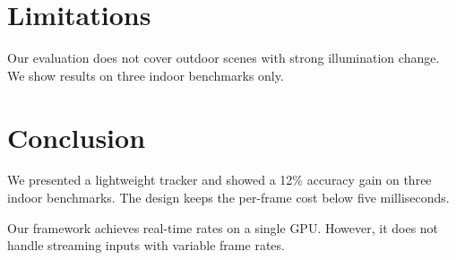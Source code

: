 \documentclass{article}
\begin{document}
\section*{Limitations}
Our evaluation does not cover outdoor scenes with strong illumination change.
We show results on three indoor benchmarks only.

\section{Conclusion}
We presented a lightweight tracker and showed a 12\% accuracy gain on three indoor benchmarks.
The design keeps the per-frame cost below five milliseconds.

Our framework achieves real-time rates on a single GPU.
However, it does not handle streaming inputs with variable frame rates.
\end{document}
